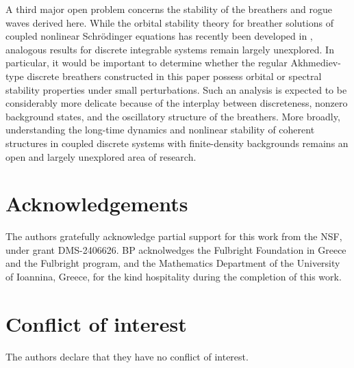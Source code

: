 \documentclass{article}
\begin{document}
A third major open problem concerns the stability of the breathers and rogue waves derived here. While the orbital stability theory for breather solutions of coupled nonlinear Schr\"odinger equations has recently been developed in \cite{Pel26}, analogous results for discrete integrable systems remain largely unexplored. In particular, it would be important to determine whether the regular Akhmediev-type discrete breathers constructed in this paper possess orbital or spectral stability properties under small perturbations. Such an analysis is expected to be considerably more delicate because of the interplay between discreteness, nonzero background states, and the oscillatory structure of the breathers. More broadly, understanding the long-time dynamics and nonlinear stability of coherent structures in coupled discrete systems with finite-density backgrounds remains an open and largely unexplored area of research.

\section*{Acknowledgements}
The authors gratefully acknowledge partial support for this work from the NSF, under grant DMS-2406626. BP acknolwedges the Fulbright Foundation in Greece and the Fulbright program, and the Mathematics Department of the University of Ioannina, Greece, for the kind hospitality during the completion of this work. 

\section*{Conflict of interest}
The authors declare that they have no conflict of interest.
\end{document}
